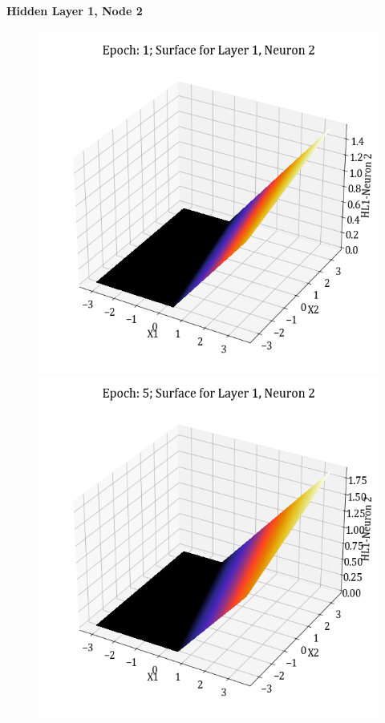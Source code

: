 \documentclass[11pt,a4paper]{article}
\begin{document}
\paragraph{Hidden Layer 1, Node 2}
\begin{figure}[H]
    \centering
    \includegraphics[scale=0.4]{images/1B_MLFFNN_E1_HL1_N2.png}
    \includegraphics[scale=0.4]{images/1B_MLFFNN_E5_HL1_N2.png}

\end{figure}
\end{document}
